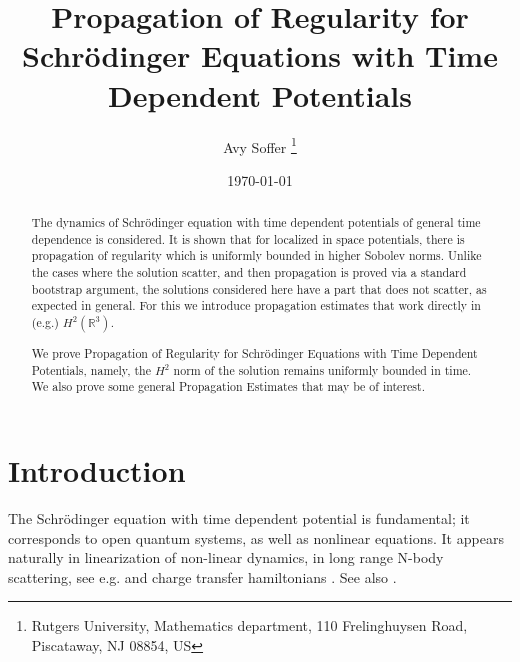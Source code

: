 \documentclass[11pt]{article}
\newcommand\R{\mathbb{R}}
\begin{document}
\title{Propagation of Regularity for Schr\"odinger Equations with Time Dependent Potentials}

\author{Avy Soffer \thanks{Rutgers University, Mathematics department, 110 Frelinghuysen Road, Piscataway, NJ 08854, US}}

\date{\today}
\maketitle

\begin{abstract}
The dynamics of Schr\"odinger equation with time dependent potentials of general time dependence is considered.
It is shown that for localized in space potentials, there is propagation of regularity which is uniformly bounded in higher Sobolev norms.
Unlike the cases where the solution scatter, and then propagation is proved via a standard bootstrap argument, the solutions considered here have a part that does not scatter, as expected in general. 
For this we introduce propagation estimates that work directly in (e.g.) $H^2(\R^3).$

   
   
             We prove Propagation of Regularity for Schr\"odinger Equations with Time Dependent Potentials, namely, the $H^2$ norm of the solution remains uniformly bounded in time. We also prove some general Propagation Estimates that may be of interest.
\end{abstract}

\section{Introduction}
The Schr\"odinger equation with time dependent potential is fundamental; it corresponds to open quantum systems, as well as nonlinear equations. It appears naturally in linearization of non-linear dynamics, in long range N-body scattering, see e.g. \cite{sigal1993asymptotic} and charge transfer hamiltonians \cite{yajima1980multi}. See also \cite{chen2026trapped}.
\end{document}
